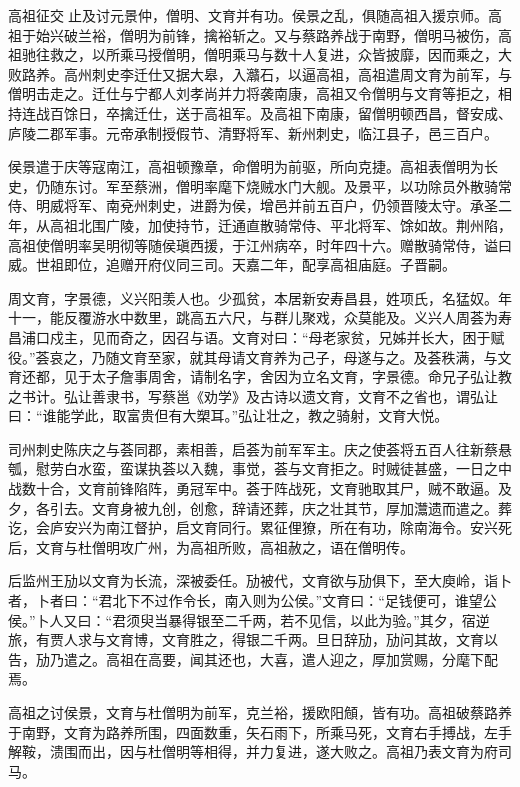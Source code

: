 \documentclass[]{article}
\begin{document}
高祖征交止及讨元景仲，僧明、文育并有功。侯景之乱，俱随高祖入援京师。高祖于始兴破兰裕，僧明为前锋，擒裕斩之。又与蔡路养战于南野，僧明马被伤，高祖驰往救之，以所乘马授僧明，僧明乘马与数十人复进，众皆披靡，因而乘之，大败路养。高州刺史李迁仕又据大皋，入灨石，以逼高祖，高祖遣周文育为前军，与僧明击走之。迁仕与宁都人刘孝尚并力将袭南康，高祖又令僧明与文育等拒之，相持连战百馀日，卒擒迁仕，送于高祖军。及高祖下南康，留僧明顿西昌，督安成、庐陵二郡军事。元帝承制授假节、清野将军、新州刺史，临江县子，邑三百户。

侯景遣于庆等寇南江，高祖顿豫章，命僧明为前驱，所向克捷。高祖表僧明为长史，仍随东讨。军至蔡洲，僧明率麾下烧贼水门大舰。及景平，以功除员外散骑常侍、明威将军、南兗州刺史，进爵为侯，增邑并前五百户，仍领晋陵太守。承圣二年，从高祖北围广陵，加使持节，迁通直散骑常侍、平北将军、馀如故。荆州陷，高祖使僧明率吴明彻等随侯瑱西援，于江州病卒，时年四十六。赠散骑常侍，谥曰威。世祖即位，追赠开府仪同三司。天嘉二年，配享高祖庙庭。子晋嗣。

周文育，字景德，义兴阳羡人也。少孤贫，本居新安寿昌县，姓项氏，名猛奴。年十一，能反覆游水中数里，跳高五六尺，与群儿聚戏，众莫能及。义兴人周荟为寿昌浦口戍主，见而奇之，因召与语。文育对曰：``母老家贫，兄姊并长大，困于赋役。''荟哀之，乃随文育至家，就其母请文育养为己子，母遂与之。及荟秩满，与文育还都，见于太子詹事周舍，请制名字，舍因为立名文育，字景德。命兄子弘让教之书计。弘让善隶书，写蔡邕《劝学》及古诗以遗文育，文育不之省也，谓弘让曰：``谁能学此，取富贵但有大槊耳。''弘让壮之，教之骑射，文育大悦。

司州刺史陈庆之与荟同郡，素相善，启荟为前军军主。庆之使荟将五百人往新蔡悬瓠，慰劳白水蛮，蛮谋执荟以入魏，事觉，荟与文育拒之。时贼徒甚盛，一日之中战数十合，文育前锋陷阵，勇冠军中。荟于阵战死，文育驰取其尸，贼不敢逼。及夕，各引去。文育身被九创，创愈，辞请还葬，庆之壮其节，厚加灊遗而遣之。葬讫，会庐安兴为南江督护，启文育同行。累征俚獠，所在有功，除南海令。安兴死后，文育与杜僧明攻广州，为高祖所败，高祖赦之，语在僧明传。

后监州王劢以文育为长流，深被委任。劢被代，文育欲与劢俱下，至大庾岭，诣卜者，卜者曰：``君北下不过作令长，南入则为公侯。''文育曰：``足钱便可，谁望公侯。''卜人又曰：``君须臾当暴得银至二千两，若不见信，以此为验。''其夕，宿逆旅，有贾人求与文育博，文育胜之，得银二千两。旦日辞劢，劢问其故，文育以告，劢乃遣之。高祖在高要，闻其还也，大喜，遣人迎之，厚加赏赐，分麾下配焉。

高祖之讨侯景，文育与杜僧明为前军，克兰裕，援欧阳頠，皆有功。高祖破蔡路养于南野，文育为路养所围，四面数重，矢石雨下，所乘马死，文育右手搏战，左手解鞍，溃围而出，因与杜僧明等相得，并力复进，遂大败之。高祖乃表文育为府司马。
\end{document}
